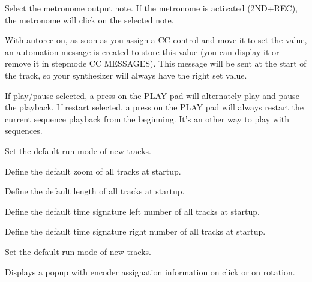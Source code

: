 Select the metronome output note. If the metronome is activated (2ND+REC), the metronome will click on the selected note.

  

With autorec on, as soon as you assign a CC control and move it to set the value, an automation message is created to store this value (you can display it or remove it in stepmode CC MESSAGES). This message will be sent at the start of the track, so your synthesizer will always have the right set value.

  

If play/pause selected, a press on the PLAY pad will alternately play and pause the playback. If restart selected, a press on the PLAY pad will always restart the current sequence playback from the beginning. It's an other way to play with sequences.

   

Set the default run mode of new tracks.

     

Define the default zoom of all tracks at startup.

  \settingopt{\ldots} 

Define the default length of all tracks at startup.

  \settingopt{\ldots} 

Define the default time signature left number of all tracks at startup.

  \settingopt{\ldots} 

Define the default time signature right number of all tracks at startup.

    \settingopt{\ldots} 

Set the default run mode of new tracks.

  

Displays a popup with encoder assignation information on click or on rotation.

